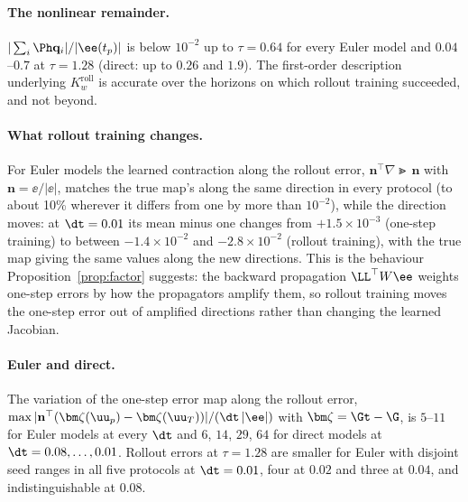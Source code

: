 \paragraph{The nonlinear remainder.}
$|\sum_i\Ph\mathbf q_i|/|\ee(t_p)|$ is below $10^{-2}$ up to $\tau = 0.64$ for every Euler model and $0.04$--$0.7$ at $\tau = 1.28$ (direct: up to $0.26$ and $1.9$).
The first-order description underlying $K^{\mathrm{roll}}_w$ is accurate over the horizons on which rollout training succeeded, and not beyond.

\paragraph{What rollout training changes.}
For Euler models the learned contraction along the rollout error, $\mathbf n^\top\nabla\Gt\,\mathbf n$ with $\mathbf n = \ee/|\ee|$, matches the true map's along the same direction in every protocol (to about 10\% wherever it differs from one by more than $10^{-2}$), while the direction moves: at $\dt = 0.01$ its mean minus one changes from $+1.5\times10^{-3}$ (one-step training) to between $-1.4\times10^{-2}$ and $-2.8\times10^{-2}$ (rollout training), with the true map giving the same values along the new directions.
This is the behaviour Proposition~\ref{prop:factor} suggests: the backward propagation $\LL^\top W\ee$ weights one-step errors by how the propagators amplify them, so rollout training moves the one-step error out of amplified directions rather than changing the learned Jacobian.

\paragraph{Euler and direct.}
The variation of the one-step error map along the rollout error, $\max|\mathbf n^\top(\bm\zeta(\uu_p) - \bm\zeta(\uu_T))|/(\dt\,|\ee|)$ with $\bm\zeta = \Gt - \G$, is $5$--$11$ for Euler models at every $\dt$ and $6$, $14$, $29$, $64$ for direct models at $\dt = 0.08,\dots,0.01$.
Rollout errors at $\tau = 1.28$ are smaller for Euler with disjoint seed ranges in all five protocols at $\dt = 0.01$, four at $0.02$ and three at $0.04$, and indistinguishable at $0.08$.


